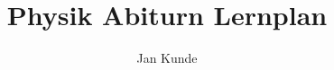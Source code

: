 \documentclass[12pt]{article}
\title{Physik Abiturn Lernplan}
\author{Jan Kunde}
\begin{document}
\maketitle
\section{}
\end{document}
